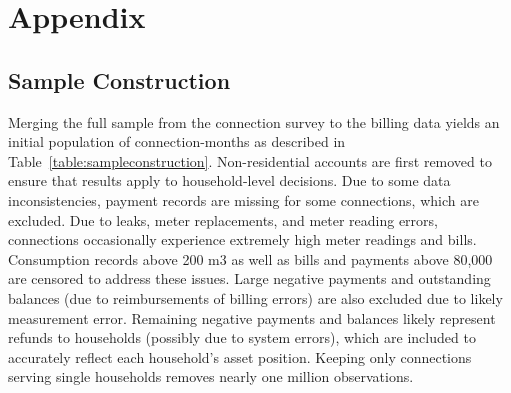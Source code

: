 \documentclass[12pt,table]{article}
\begin{document}








\pagebreak

\section{Appendix}



\subsection{Sample Construction}\label{appendix:sampleconstruction}

Merging the full sample from the connection survey to the billing data yields an initial population of connection-months as described in Table~\ref{table:sampleconstruction}.  Non-residential accounts are first removed to ensure that results apply to household-level decisions.  Due to some data inconsistencies, payment records are missing for some connections, which are excluded.  Due to leaks, meter replacements, and meter reading errors, connections occasionally experience extremely high meter readings and bills.  Consumption records above 200 m3 as well as bills and payments above 80,000 are censored to address these issues.  Large negative payments and outstanding balances (due to reimbursements of billing errors) are also excluded due to likely measurement error.  Remaining negative payments and balances likely represent refunds to households (possibly due to system errors), which are included to accurately reflect each household's asset position.  Keeping only connections serving single households removes nearly one million observations.
\end{document}

